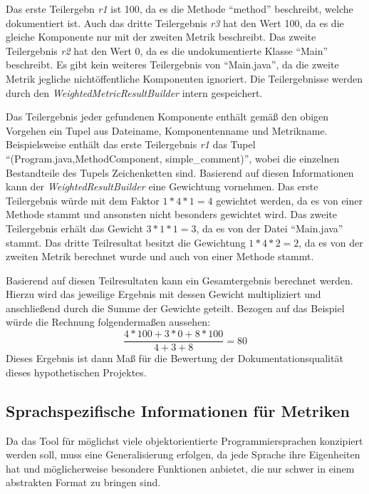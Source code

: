 Das erste Teilergebn \textit{r1} ist 100, da es die  Methode \enquote{method} beschreibt, welche dokumentiert ist. Auch das dritte Teilergebnis \textit{r3} hat den Wert 100, da es die gleiche Komponente nur mit der zweiten Metrik beschreibt. Das zweite Teilergebnis \textit{r2} hat den Wert 0, da es die undokumentierte Klasse \enquote{Main} beschreibt.  Es gibt kein weiteres Teilergebnis von \enquote{Main.java}, da die zweite Metrik jegliche nichtöffentliche Komponenten ignoriert. Die Teilergebnisse werden durch den \textit{WeightedMetricResultBuilder} intern gespeichert. 

Das Teilergebnis jeder gefundenen Komponente enthält gemäß den obigen Vorgehen ein Tupel aus Dateiname, Komponentenname und Metrikname. Beispielsweise enthält das erste  Teilergebnis \textit{r1} das Tupel \enquote{(Program.java,MethodComponent, simple\_comment)}, wobei die einzelnen Bestandteile des Tupels Zeichenketten sind. Basierend auf diesen Informationen kann der \textit{WeightedResultBuilder} eine Gewichtung vornehmen. Das erste Teilergebnis würde mit dem Faktor $1*4*1=4$ gewichtet werden, da es von einer Methode stammt  und ansonsten nicht besonders gewichtet wird. Das zweite Teilergebnis erhält das Gewicht $3*1*1=3$, da es von der Datei \enquote{Main.java} stammt. Das dritte Teilresultat besitzt die Gewichtung $1*4*2=2$, da es von der zweiten Metrik berechnet wurde und auch von einer Methode stammt. 

Basierend auf diesen Teilresultaten kann ein Gesamtergebnis berechnet werden. Hierzu wird das jeweilige Ergebnis mit dessen Gewicht multipliziert und anschließend durch die Summe der Gewichte geteilt. Bezogen auf das Beispiel würde die Rechnung folgendermaßen aussehen:
\begin{equation}
    \frac{4*100 + 3*0 + 8*100}{4+3+8}=80
\end{equation}
Dieses Ergebnis ist dann Maß für die Bewertung der Dokumentationsqualität dieses hypothetischen Projektes. 
\clearpage
\subsection{Sprachspezifische Informationen für Metriken}\label{chapter:langSpec}
Da das Tool für möglichst viele objektorientierte Programmiersprachen konzipiert werden soll, muss eine Generalisierung erfolgen, da jede Sprache ihre Eigenheiten hat und möglicherweise besondere Funktionen anbietet, die nur schwer in einem abstrakten Format zu bringen sind.

